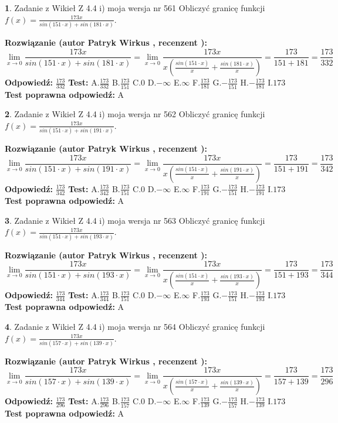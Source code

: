 \documentclass[12pt, a4paper]{article}
\theoremstyle{definition} %
\newtheorem{zad}{}
\newcommand{\zadStart}[1]{\begin{zad}#1\newline}
\newcommand{\zadStop}{\end{zad}}
\newcommand{\rozwStart}[2]{\noindent \textbf{Rozwiązanie (autor #1 , recenzent #2): }\newline}
\newcommand{\rozwStop}{\newline}
\newcommand{\odpStart}{\noindent \textbf{Odpowiedź:}\newline}
\newcommand{\odpStop}{\newline}
\newcommand{\testStart}{\noindent \textbf{Test:}\newline}
\newcommand{\testStop}{\newline}
\newcommand{\kluczStart}{\noindent \textbf{Test poprawna odpowiedź:}\newline}
\newcommand{\kluczStop}{\newline}
\begin{document}
\zadStart{Zadanie z Wikieł Z 4.4 i) moja wersja nr 561}
Obliczyć granicę funkcji $f(x)=\frac{173x}{sin(151\cdot x) +sin(181\cdot x)}$.
\zadStop
\rozwStart{Patryk Wirkus}{}
$$\lim\limits_{x\to 0}\frac{173x}{sin(151\cdot x) +sin(181\cdot x)}=\lim\limits_{x\to 0}\frac{173x}{x(\frac{sin(151\cdot x)}{x}+\frac{sin(181\cdot x)}{x})}=\frac{173}{151+181} = \frac{173}{332}$$
\rozwStop
\odpStart
$\frac{173}{332}$
\odpStop
\testStart
A.$\frac{173}{332}$
B.$\frac{173}{151}$
C.$0$
D.$-\infty$
E.$\infty$
F.$\frac{173}{181}$
G.$-\frac{173}{151}$
H.$-\frac{173}{181}$
I.$173$
\testStop
\kluczStart
A
\kluczStop



\zadStart{Zadanie z Wikieł Z 4.4 i) moja wersja nr 562}
Obliczyć granicę funkcji $f(x)=\frac{173x}{sin(151\cdot x) +sin(191\cdot x)}$.
\zadStop
\rozwStart{Patryk Wirkus}{}
$$\lim\limits_{x\to 0}\frac{173x}{sin(151\cdot x) +sin(191\cdot x)}=\lim\limits_{x\to 0}\frac{173x}{x(\frac{sin(151\cdot x)}{x}+\frac{sin(191\cdot x)}{x})}=\frac{173}{151+191} = \frac{173}{342}$$
\rozwStop
\odpStart
$\frac{173}{342}$
\odpStop
\testStart
A.$\frac{173}{342}$
B.$\frac{173}{151}$
C.$0$
D.$-\infty$
E.$\infty$
F.$\frac{173}{191}$
G.$-\frac{173}{151}$
H.$-\frac{173}{191}$
I.$173$
\testStop
\kluczStart
A
\kluczStop



\zadStart{Zadanie z Wikieł Z 4.4 i) moja wersja nr 563}
Obliczyć granicę funkcji $f(x)=\frac{173x}{sin(151\cdot x) +sin(193\cdot x)}$.
\zadStop
\rozwStart{Patryk Wirkus}{}
$$\lim\limits_{x\to 0}\frac{173x}{sin(151\cdot x) +sin(193\cdot x)}=\lim\limits_{x\to 0}\frac{173x}{x(\frac{sin(151\cdot x)}{x}+\frac{sin(193\cdot x)}{x})}=\frac{173}{151+193} = \frac{173}{344}$$
\rozwStop
\odpStart
$\frac{173}{344}$
\odpStop
\testStart
A.$\frac{173}{344}$
B.$\frac{173}{151}$
C.$0$
D.$-\infty$
E.$\infty$
F.$\frac{173}{193}$
G.$-\frac{173}{151}$
H.$-\frac{173}{193}$
I.$173$
\testStop
\kluczStart
A
\kluczStop



\zadStart{Zadanie z Wikieł Z 4.4 i) moja wersja nr 564}
Obliczyć granicę funkcji $f(x)=\frac{173x}{sin(157\cdot x) +sin(139\cdot x)}$.
\zadStop
\rozwStart{Patryk Wirkus}{}
$$\lim\limits_{x\to 0}\frac{173x}{sin(157\cdot x) +sin(139\cdot x)}=\lim\limits_{x\to 0}\frac{173x}{x(\frac{sin(157\cdot x)}{x}+\frac{sin(139\cdot x)}{x})}=\frac{173}{157+139} = \frac{173}{296}$$
\rozwStop
\odpStart
$\frac{173}{296}$
\odpStop
\testStart
A.$\frac{173}{296}$
B.$\frac{173}{157}$
C.$0$
D.$-\infty$
E.$\infty$
F.$\frac{173}{139}$
G.$-\frac{173}{157}$
H.$-\frac{173}{139}$
I.$173$
\testStop
\kluczStart
A
\kluczStop
\end{document}
